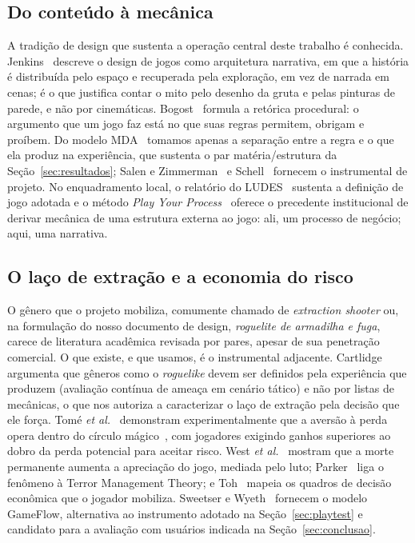 \documentclass[conference]{IEEEtran}
\begin{document}
\subsection{Do conteúdo à mecânica}

A tradição de design que sustenta a operação central deste trabalho é conhecida.
Jenkins~\cite{jenkins2004} descreve o design de jogos como arquitetura narrativa, em que
a história é distribuída pelo espaço e recuperada pela exploração, em vez de narrada em
cenas; é o que justifica contar o mito pelo desenho da gruta e pelas pinturas de parede,
e não por cinemáticas. Bogost~\cite{bogost2007} formula a retórica procedural: o
argumento que um jogo faz está no que suas regras permitem, obrigam e proíbem. Do modelo
MDA~\cite{hunicke2004} tomamos apenas a separação entre a regra e o que ela produz na
experiência, que sustenta o par matéria/estrutura da Seção~\ref{sec:resultados}; Salen e
Zimmerman~\cite{salen2003} e Schell~\cite{schell2019} fornecem o instrumental de
projeto. No enquadramento local, o relatório do LUDES~\cite{xexeo2017jogos} sustenta a
definição de jogo adotada e o método \textit{Play Your Process}~\cite{classe2019play}
oferece o precedente institucional de derivar mecânica de uma estrutura externa ao jogo:
ali, um processo de negócio; aqui, uma narrativa.

\subsection{O laço de extração e a economia do risco}

O gênero que o projeto mobiliza, comumente chamado de \textit{extraction shooter} ou, na
formulação do nosso documento de design, \textit{roguelite de armadilha e fuga}, carece
de literatura acadêmica revisada por pares, apesar de sua penetração comercial. O que
existe, e que usamos, é o instrumental adjacente. Cartlidge~\cite{cartlidge2024}
argumenta que gêneros como o \textit{roguelike} devem ser definidos pela experiência que
produzem (avaliação contínua de ameaça em cenário tático) e não por listas de mecânicas,
o que nos autoriza a caracterizar o laço de extração pela decisão que ele força. Tomé
\textit{et al.}~\cite{tome2020} demonstram experimentalmente que a aversão à perda opera
dentro do círculo mágico~\cite{huizinga2000}, com jogadores exigindo ganhos superiores
ao dobro da perda potencial para aceitar risco. West \textit{et al.}~\cite{west2022}
mostram que a morte permanente aumenta a apreciação do jogo, mediada pelo luto;
Parker~\cite{parker2017} liga o fenômeno à Terror Management Theory; e
Toh~\cite{toh2021} mapeia os quadros de decisão econômica que o jogador mobiliza.
Sweetser e Wyeth~\cite{sweetser2005} fornecem o modelo GameFlow, alternativa ao
instrumento adotado na Seção~\ref{sec:playtest} e candidato para a avaliação com
usuários indicada na Seção~\ref{sec:conclusao}.
\end{document}
